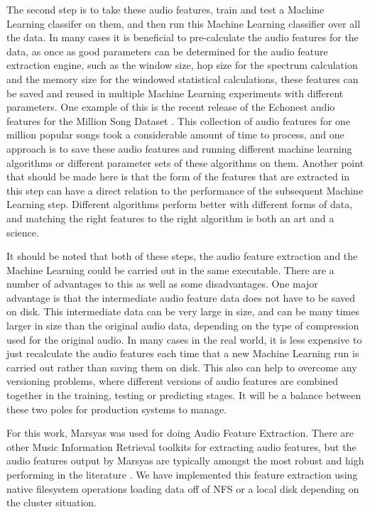 The second step is to take these audio features, train and test a
Machine Learning classifer on them, and then run this Machine Learning
classifier over all the data.  In many cases it is beneficial to
pre-calculate the audio features for the data, as once as good
parameters can be determined for the audio feature extraction engine,
such as the window size, hop size for the spectrum calculation and the
memory size for the windowed statistical calculations, these features
can be saved and reused in multiple Machine Learning experiments with
different parameters.  One example of this is the recent release of
the Echonest audio features for the Million Song Dataset
\cite{bertinmahieux11}.  This collection of audio features for one
million popular songs took a considerable amount of time to process,
and one approach is to save these audio features and running different
machine learning algorithms or different parameter sets of these
algorithms on them.  Another point that should be made here is that
the form of the features that are extracted in this step can have a
direct relation to the performance of the subsequent Machine Learning
step.  Different algorithms perform better with different forms of
data, and matching the right features to the right algorithm is both
an art and a science.

It should be noted that both of these steps, the audio feature
extraction and the Machine Learning could be carried out in the same
executable.  There are a number of advantages to this as well as some
disadvantages.  One major advantage is that the intermediate audio
feature data does not have to be saved on disk.  This intermediate
data can be very large in size, and can be many times larger in size
than the original audio data, depending on the type of compression
used for the original audio.  In many cases in the real world, it is
less expensive to just recalculate the audio features each time that a
new Machine Learning run is carried out rather than saving them on
disk.  This also can help to overcome any versioning problems, where
different versions of audio features are combined together in the
training, testing or predicting stages.  It will be a balance between
these two poles for production systems to manage.

For this work, Marsyas was used for doing Audio Feature Extraction.
There are other Music Information Retrieval toolkits for extracting
audio features, but the audio features output by Marsyas are typically
amongst the most robust and high performing in the literature
\cite{marsyas}.  We have implemented this feature extraction using
native filesystem operations loading data off of NFS or a local disk
depending on the cluster situation.

